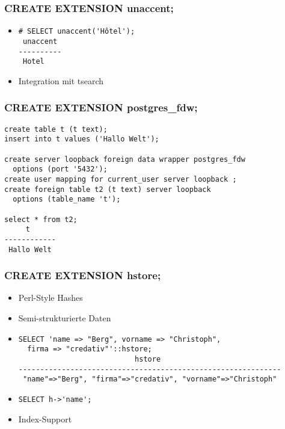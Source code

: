 \documentclass[utf8,hyperref={pdftex,colorlinks,linkcolor=black,citecolor=black,urlcolor=black,filecolor=black,plainpages=false},xcolor=table,hyperref]{beamer}
\begin{document}
\begin{frame}[containsverbatim]
	\frametitle{CREATE EXTENSION unaccent;}
	\begin{itemize}
		\item 
			\begin{verbatim}
# SELECT unaccent('Hôtel');
 unaccent 
----------
 Hotel
 \end{verbatim}
 \item Integration mit tsearch
	 \end{itemize} 
\end{frame}

\begin{frame}[containsverbatim]
	\frametitle{CREATE EXTENSION postgres_fdw;}
	\begin{verbatim}
create table t (t text);
insert into t values ('Hallo Welt');

create server loopback foreign data wrapper postgres_fdw
  options (port '5432');
create user mapping for current_user server loopback ;
create foreign table t2 (t text) server loopback
  options (table_name 't');

select * from t2;
     t      
------------
 Hallo Welt
\end{verbatim}
\end{frame}

\begin{frame}[containsverbatim]
	\frametitle{CREATE EXTENSION hstore;}
	\begin{itemize}
		\item Perl-Style Hashes
		\item Semi-strukturierte Daten
		\item \begin{verbatim}
SELECT 'name => "Berg", vorname => "Christoph",
  firma => "credativ"'::hstore;
                           hstore                            
-------------------------------------------------------------
 "name"=>"Berg", "firma"=>"credativ", "vorname"=>"Christoph"
 \end{verbatim}
 \item \verb|SELECT h->'name';|
 \item Index-Support
 \end{itemize}
\end{frame}
\end{document}
